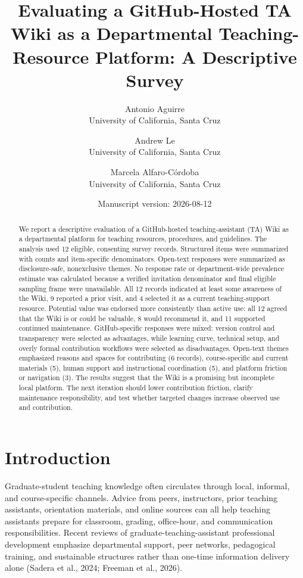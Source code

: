 \documentclass[11pt]{article}
\title{Evaluating a GitHub-Hosted TA Wiki as a Departmental Teaching-Resource Platform: A Descriptive Survey}
\author{Antonio Aguirre\\University of California, Santa Cruz \and Andrew Le\\University of California, Santa Cruz \and Marcela Alfaro-C\'ordoba\\University of California, Santa Cruz}
\date{Manuscript version: 2026-08-12}
\begin{document}
\maketitle
\linenumbers
\begin{abstract}
We report a descriptive evaluation of a GitHub-hosted teaching-assistant (TA) Wiki as a departmental platform for teaching resources, procedures, and guidelines. The analysis used 12 eligible, consenting survey records. Structured items were summarized with counts and item-specific denominators. Open-text responses were summarized as disclosure-safe, nonexclusive themes. No response rate or department-wide prevalence estimate was calculated because a verified invitation denominator and final eligible sampling frame were unavailable. All 12 records indicated at least some awareness of the Wiki, 9 reported a prior visit, and 4 selected it as a current teaching-support resource. Potential value was endorsed more consistently than active use: all 12 agreed that the Wiki is or could be valuable, 8 would recommend it, and 11 supported continued maintenance. GitHub-specific responses were mixed: version control and transparency were selected as advantages, while learning curve, technical setup, and overly formal contribution workflows were selected as disadvantages. Open-text themes emphasized reasons and spaces for contributing (6 records), course-specific and current materials (5), human support and instructional coordination (5), and platform friction or navigation (3). The results suggest that the Wiki is a promising but incomplete local platform. The next iteration should lower contribution friction, clarify maintenance responsibility, and test whether targeted changes increase observed use and contribution.
\end{abstract}
\section{Introduction}
Graduate-student teaching knowledge often circulates through local, informal, and course-specific channels. Advice from peers, instructors, prior teaching assistants, orientation materials, and online sources can all help teaching assistants prepare for classroom, grading, office-hour, and communication responsibilities. Recent reviews of graduate-teaching-assistant professional development emphasize departmental support, peer networks, pedagogical training, and sustainable structures rather than one-time information delivery alone (Sadera et al., 2024; Freeman et al., 2026).
\end{document}
